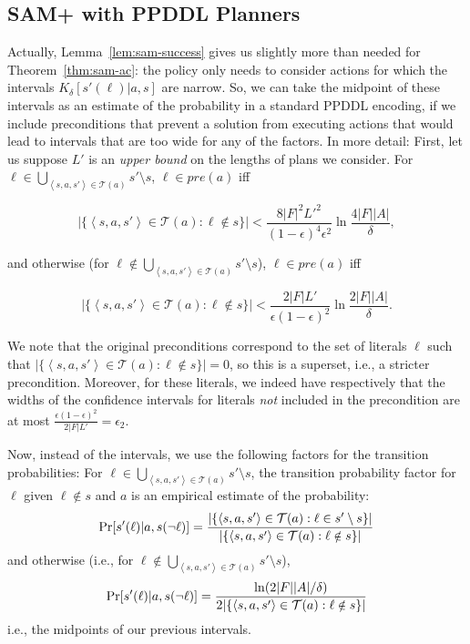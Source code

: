 \documentclass[letterpaper]{article} %
\newcommand{\pre}{\textit{pre}}
\newcommand{\tuple}[1]{\ensuremath{\left \langle #1 \right \rangle }}
\begin{document}
\subsection{SAM+ with PPDDL Planners}
Actually, Lemma~\ref{lem:sam-success} gives us slightly more than needed for Theorem~\ref{thm:sam-ac}: the policy only needs to consider actions for which the intervals $K_\delta[s'(\ell)|a,s]$ are narrow. So, we can take the midpoint of these intervals as an estimate of the probability in a standard PPDDL encoding, if we include 
preconditions
that prevent a solution from executing actions that would lead to intervals that are too wide for any of the factors. In more detail: First, let us suppose $L'$ is an {\em upper bound} on the lengths of plans we consider. For $\ell\in\bigcup_{\tuple{s, a, s'}\in \mathcal{T}(a)} s'\setminus s $, $\ell\in\pre(a)$ iff 
\begin{small}
\begin{equation*}
|\{\tuple{s, a, s'}\in \mathcal{T}(a):\ell\notin s\}|< \frac{8|F|^2L'^2}{(1-\epsilon)^4\epsilon^2}\ln\frac{4|F||A|}{\delta},
\end{equation*}
\end{small}
and otherwise (for $\ell\notin\bigcup_{\tuple{s, a, s'}\in \mathcal{T}(a)} s'\setminus s $),  $\ell\in\pre(a)$ iff 
\begin{small}
\begin{equation*}
|\{\tuple{s, a, s'}\in \mathcal{T}(a):\ell\notin s\}|<\frac{2|F|L'}{\epsilon(1-\epsilon)^2}\ln\frac{2|F||A|}{\delta}.
\end{equation*}
\end{small}
We note that the original preconditions correspond to the set of literals $\ell$ such that $|\{\tuple{s, a, s'}\in \mathcal{T}(a):\ell\notin s\}|=0$, so this is a superset, i.e., a stricter precondition. Moreover, for these literals, we indeed have respectively that the widths of the confidence intervals for literals {\em not} included in the precondition are at most $\frac{\epsilon(1-\epsilon)^2}{2|F|L'}=\epsilon_2$.

Now, instead of the intervals, we use the following factors for the transition probabilities: For $\ell\in\bigcup_{\tuple{s, a, s'}\in \mathcal{T}(a)} s'\setminus s $, the transition probability factor for $\ell$ given $\ell\notin s$ and $a$ is an empirical estimate of the probability:
\begin{equation}
\small
\Pr[s'(\ell)|a,s(\neg\ell)]=\frac{|\{\tuple{s, a, s'}\in \mathcal{T}(a):\ell\in s'\setminus s\}|}{|\{\tuple{s, a, s'}\in \mathcal{T}(a):\ell \notin s\}|}
\end{equation}
and otherwise (i.e., for $\ell\notin\bigcup_{\tuple{s, a, s'}\in \mathcal{T}(a)} s'\setminus s $),
\begin{equation}
\small
\Pr[s'(\ell)|a,s(\neg\ell)]=\frac{\ln(2|F||A|/\delta)}{2|\{\tuple{s, a, s'}\in \mathcal{T}(a):\ell\notin s\}|}
\end{equation}
i.e., the midpoints of our previous intervals.
\end{document}
